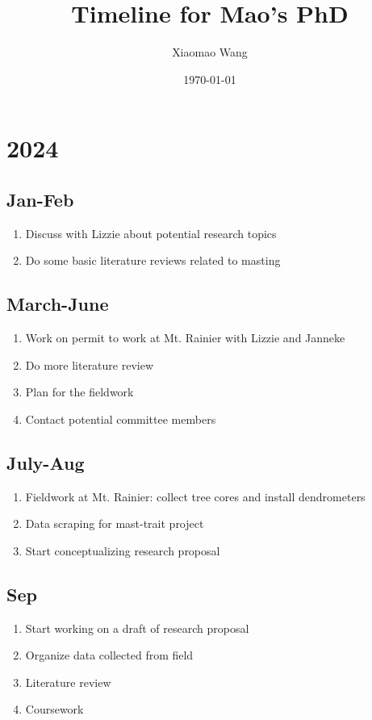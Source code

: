 \documentclass[12pt,letter]{article}
\begin{document}

\renewcommand{\refname}{\CHead{}}

\title{Timeline for Mao's PhD}
\author{Xiaomao Wang} 
\date{\today}
\maketitle

\setlength{\parindent}{0pt}
\setlength{\parskip}{3pt}

\section{2024}
\subsection{Jan-Feb}
 \begin{enumerate}
	\item Discuss with Lizzie about potential research topics
	\item Do some basic literature reviews related to masting
	\end{enumerate}
\subsection{March-June}
 \begin{enumerate}
	\item Work on permit to work at Mt. Rainier with Lizzie and Janneke
	\item Do more literature review
	\item Plan for the fieldwork
	\item Contact potential committee members
	\end{enumerate}
\subsection{July-Aug}
 \begin{enumerate}
	\item Fieldwork at Mt. Rainier: collect tree cores and install dendrometers
	\item Data scraping for mast-trait project
	\item Start conceptualizing research proposal
	\end{enumerate}
\subsection{Sep}
 \begin{enumerate}
	\item Start working on a draft of research proposal
	\item Organize data collected from field
	\item Literature review
	\item Coursework
	\end{enumerate}
\end{document}
